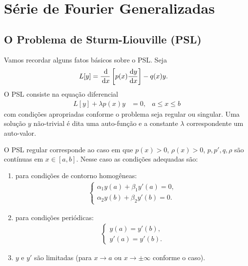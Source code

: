 %
%

%

\chapter{Série de Fourier Generalizadas}
\section{O Problema de Sturm-Liouville (PSL)}
Vamos recordar alguns fatos básicos sobre o PSL. Seja
\begin{align*}
    L[y] &= \frac{\, \mathrm{d}}{\, \mathrm{d}x}\left[ p(x) \frac{\, \mathrm{d}y}{\, \mathrm{d}x} \right] - q(x) y.
\end{align*}
O PSL consiste na equação diferencial
\begin{align*}
    L[y] + \lambda p(x) y &= 0, & a \leq x \leq b
\end{align*}
com condições apropriadas conforme o problema seja regular ou singular. Uma solução $y$ não-trivial é dita uma auto-função e a constante $\lambda$ correspondente um auto-valor.

O PSL regular corresponde ao caso em que $p(x) > 0$, $\rho(x) > 0$, $p, p', q, \rho$ são contínuas em $x \in [a,b]$. Nesse caso as condições adequadas são:
\begin{enumerate}
    \item para condições de contorno homogêneas:
        \begin{align*}
            \begin{cases}
                \alpha_1 y(a) + \beta_1 y'(a) = 0, \\
                \alpha_2 y(b) + \beta_2 y'(b) = 0.
            \end{cases}
        \end{align*}
    \item para condições periódicas:
        \begin{align*}
            \begin{cases}
                y(a) = y'(b), \\
                y'(a) = y'(b).
            \end{cases}
        \end{align*}
    \item $y$ e $y'$ são limitadas (para $x \to a$ ou $x \to \pm \infty$ conforme o caso).
\end{enumerate}

